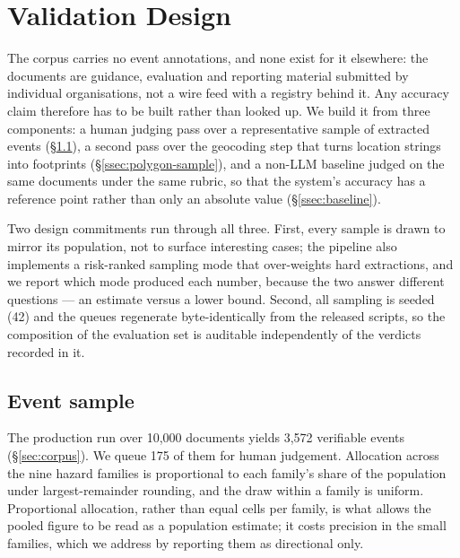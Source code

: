 
\section{Validation Design}
\label{sec:validation}

The corpus carries no event annotations, and none exist for it elsewhere: the
documents are guidance, evaluation and reporting material submitted by
individual organisations, not a wire feed with a registry behind it. Any
accuracy claim therefore has to be built rather than looked up. We build it
from three components: a human judging pass over a representative sample of
extracted events (\S\ref{ssec:event-sample}), a second pass over the geocoding
step that turns location strings into footprints (\S\ref{ssec:polygon-sample}),
and a non-LLM baseline judged on the same documents under the same rubric, so
that the system's accuracy has a reference point rather than only an absolute
value (\S\ref{ssec:baseline}).

Two design commitments run through all three. First, every sample is drawn to
mirror its population, not to surface interesting cases; the pipeline also
implements a risk-ranked sampling mode that over-weights hard extractions, and
we report which mode produced each number, because the two answer different
questions --- an estimate versus a lower bound. Second, all sampling is seeded
(42) and the queues regenerate byte-identically from the released scripts, so
the composition of the evaluation set is auditable independently of the
verdicts recorded in it.

\subsection{Event sample}
\label{ssec:event-sample}

The production run over 10{,}000 documents yields 3{,}572 verifiable events
(\S\ref{sec:corpus}). We queue 175 of them for human judgement. Allocation
across the nine hazard families is proportional to each family's share of the
population under largest-remainder rounding, and the draw within a family is
uniform. Proportional allocation, rather than equal cells per family, is what
allows the pooled figure to be read as a population estimate; it costs
precision in the small families, which we address by reporting them as
directional only.

